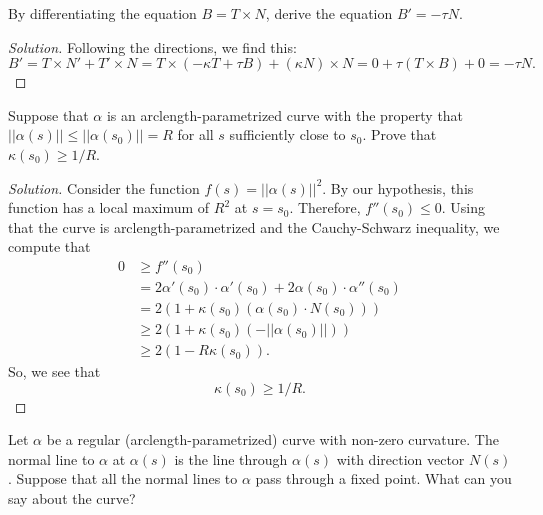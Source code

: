 \documentclass[Shifrin_Solutions_Spring_2015]{subfiles}
\begin{document}
\vspace{.5cm}


\begin{exercise}
By differentiating the equation $ B = T\times N$, derive the equation $B' = -\tau N$.
\end{exercise}

\begin{proof}[Solution]
Following the directions, we find this:
\[
B' = T \times N' + T' \times N = T \times (-\kappa T + \tau B) + (\kappa N) \times N = 0 + \tau (T\times B) + 0 = -\tau N.
\]
\end{proof}



\begin{exercise}
Suppose that $\alpha$ is an arclength-parametrized curve with the property that $||\alpha(s)|| \leq ||\alpha(s_0)|| =R$ for all $s$ sufficiently close to $s_0$. Prove that $\kappa(s_0)\geq 1/R$.
\end{exercise}

\begin{proof}[Solution]
Consider the function $f(s) = ||\alpha(s)||^2$. By our hypothesis, this function has a local maximum of $R^2$ at $s = s_0$. Therefore, $f''(s_0) \leq 0$. Using that the curve is arclength-parametrized and the Cauchy-Schwarz inequality, we compute that
\[
\begin{split}
0 & \geq f''(s_0)\\
	& = 2 \alpha'(s_0) \cdot \alpha'(s_0) + 2 \alpha(s_0) \cdot \alpha''(s_0) \\
	& = 2 \left( 1 + \kappa(s_0) (\alpha(s_0)\cdot N(s_0)) \right) \\
	& \geq 2 \left( 1 + \kappa(s_0) ( -||\alpha(s_0)||) \right) \\
	& \geq 2 \left( 1 - R \kappa(s_0) \right) .
\end{split}
\]
So, we see that
\[
\kappa(s_0) \geq 1/R .
\]
\end{proof}




\begin{exercise}
Let $\alpha$ be a regular (arclength-parametrized) curve with non-zero curvature. The normal line to $\alpha$ at $\alpha(s)$ is the line through $\alpha(s)$ with direction vector $N(s)$. Suppose that all the normal lines to $\alpha$ pass through a fixed point. What can you say about the curve?
\end{exercise}
\end{document}
